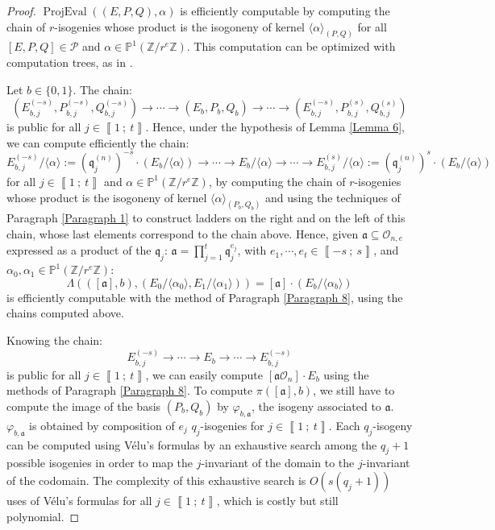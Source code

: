 \documentclass[a4paper,10pt,notitlepage]{report}
\theoremstyle{definition}
\theoremstyle{plain}
\theoremstyle{definition}
\newcommand{\Z}{\mathbb{Z}}
\newcommand{\m}[1]{\mathcal{#1}}
\newcommand{\mO}{\mathcal{O}}
\renewcommand{\i}[2]{\left\llbracket #1~;~#2\right\rrbracket}
\renewcommand{\(}{\left(}
\renewcommand{\)}{\right)}
\renewcommand{\P}{\mathbb{P}}
\newcommand{\mf}[1]{\mathfrak{#1}}
\DeclareMathOperator{\ProjEval}{ProjEval}
\begin{document}
\begin{proof}
$\ProjEval((E,P,Q),\alpha)$ is efficiently computable by computing the chain of $r$-isogenies whose product is the isogoneny of kernel $\langle\alpha\rangle_{(P,Q)}$ for all $[E,P,Q]\in \m{P}$ and $\alpha\in\P^1(\Z/r^e\Z)$. This computation can be optimized with computation trees, as in \cite[Section 4.2.2]{DeFeoSIDH}.

Let $b\in\{0,1\}$. The chain:
\[(E_{b,j}^{(-s)},P_{b,j}^{(-s)},Q_{b,j}^{(-s)})\longrightarrow \cdots \longrightarrow (E_{b},P_b,Q_b)\longrightarrow \cdots\longrightarrow (E_{b,j}^{(-s)},P_{b,j}^{(s)},Q_{b,j}^{(s)})\]
is public for all $j\in\i{1}{t}$. Hence, under the hypothesis of Lemma \ref{Lemma 6}, we can compute efficiently the chain:
\[E_{b,j}^{(-s)}/\langle\alpha\rangle:=(\mf{q}_j^{(n)})^{-s}\cdot (E_b/\langle\alpha\rangle)\longrightarrow \cdots \longrightarrow E_b/\langle\alpha\rangle\longrightarrow \cdots\longrightarrow E_{b,j}^{(s)}/\langle\alpha\rangle:=(\mf{q}_j^{(n)})^{s}\cdot(E_b/\langle\alpha\rangle)\]
for all $j\in\i{1}{t}$ and $\alpha\in\P^1(\Z/r^e\Z)$, by computing the chain of $r$-isogenies whose product is the isogoneny of kernel $\langle\alpha\rangle_{(P_b,Q_b)}$ and using the techniques of Paragraph \ref{Paragraph 1} to construct ladders on the right and on the left of this chain, whose last elements correspond to the chain above. Hence, given $\mf{a}\subseteq\mO_{n,e}$ expressed as a product of the $\mf{q}_j$: $\mf{a}=\prod_{j=1}^t\mf{q}_j^{e_j}$, with $e_1, \cdots, e_t\in\i{-s}{s}$, and $\alpha_0,\alpha_1\in\P^1(\Z/r^e\Z)$:
\[\Lambda(([\mf{a}],b),(E_0/\langle\alpha_0\rangle,E_1/\langle\alpha_1\rangle))=[\mf{a}]\cdot (E_b/\langle\alpha_b\rangle)\] 
is efficiently computable with the method of Paragraph \ref{Paragraph 8}, using the chains computed above. 

Knowing the chain:
\[E_{b,j}^{(-s)}\longrightarrow \cdots \longrightarrow E_{b}\longrightarrow \cdots\longrightarrow E_{b,j}^{(-s)}\]
is public for all $j\in\i{1}{t}$, we can easily compute $[\mf{a}\mO_n]\cdot E_b$ using the methods of Paragraph \ref{Paragraph 8}.  To compute $\pi([\mf{a}],b)$, we still have to compute the image of the basis $(P_b,Q_b)$ by $\varphi_{b,\mf{a}}$, the isogeny associated to $\mf{a}$.  $\varphi_{b,\mf{a}}$ is obtained by composition of $e_j$ $q_j$-isogenies for $j\in\i{1}{t}$.  Each $q_j$-isogeny can be computed using V\'{e}lu's formulas by an exhaustive search among the $q_j+1$ possible isogenies in order to map the $j$-invariant of the domain to the $j$-invariant of the codomain. The complexity of this exhaustive search is $O(s(q_j+1))$ uses of V\'{e}lu's formulas for all $j\in\i{1}{t}$, which is costly but still polynomial.
\end{proof}
\end{document}
